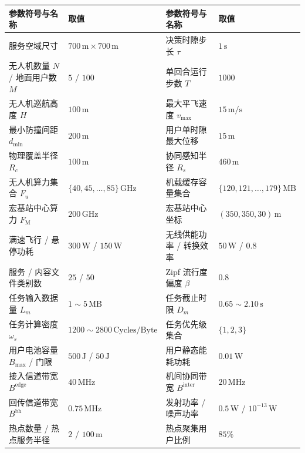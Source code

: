 \begin{table}[!htbp]
    \centering
    \label{tab:ch3-params}
    \footnotesize
    \begin{tabular}{llll}
        \toprule
        参数符号与名称 & 取值 & 参数符号与名称 & 取值 \\
        \midrule
        服务空域尺寸 & $700\,\mathrm{m}\times700\,\mathrm{m}$ & 决策时隙步长 $\tau$ & $1\,\mathrm{s}$ \\
        无人机数量 $N$ / 地面用户数 $M$ & $5$ / $100$ & 单回合运行步数 $T$ & $1000$ \\
        无人机巡航高度 $H$ & $100\,\mathrm{m}$ & 最大平飞速度 $v_{\max}$ & $15\,\mathrm{m/s}$ \\
        最小防撞间距 $d_{\min}$ & $200\,\mathrm{m}$ & 用户单时隙最大位移 & $15\,\mathrm{m}$ \\
        物理覆盖半径 $R_c$ & $100\,\mathrm{m}$ & 协同感知半径 $R_s$ & $460\,\mathrm{m}$ \\
        无人机算力集合 $F_u$ & $\{40, 45, \dots, 85\}\,\mathrm{GHz}$ & 机载缓存容量集合 & $\{120, 121, \dots, 179\}\,\mathrm{MB}$ \\
        宏基站中心算力 $F_{\mathrm M}$ & $200\,\mathrm{GHz}$ & 宏基站中心坐标 & $(350, 350, 30)\,\mathrm{m}$ \\
        满速飞行 / 悬停功耗 & $300\,\mathrm{W}$ / $150\,\mathrm{W}$ & 无线供能功率 / 转换效率 & $50\,\mathrm{W}$ / $0.8$ \\
        服务 / 内容文件类别数 & $25$ / $50$ & Zipf 流行度偏度 $\beta$ & $0.8$ \\
        任务输入数据量 $L_m$ & $1\sim 5\,\mathrm{MB}$ & 任务截止时限 $D_m$ & $0.65\sim 2.10\,\mathrm{s}$ \\
        任务计算密度 $\omega_s$ & $1200\sim 2800\,\text{Cycles/Byte}$ & 任务优先级集合 & $\{1, 2, 3\}$ \\
        用户电池容量 $B_{\max}$ / 门限 & $500\,\mathrm{J}$ / $50\,\mathrm{J}$ & 用户静态能耗功耗 & $0.01\,\mathrm{W}$ \\
        接入信道带宽 $B^{\mathrm{edge}}$ & $40\,\mathrm{MHz}$ & 机间协同带宽 $B^{\mathrm{inter}}$ & $20\,\mathrm{MHz}$ \\
        回传信道带宽 $B^{\mathrm{bh}}$ & $0.75\,\mathrm{MHz}$ & 发射功率 / 噪声功率 & $0.5\,\mathrm{W}$ / $10^{-13}\,\mathrm{W}$ \\
        热点数量 / 热点服务半径 & $2$ / $100\,\mathrm{m}$ & 热点聚集用户比例 & $85\%$ \\
        \bottomrule
    \end{tabular}
\end{table}

